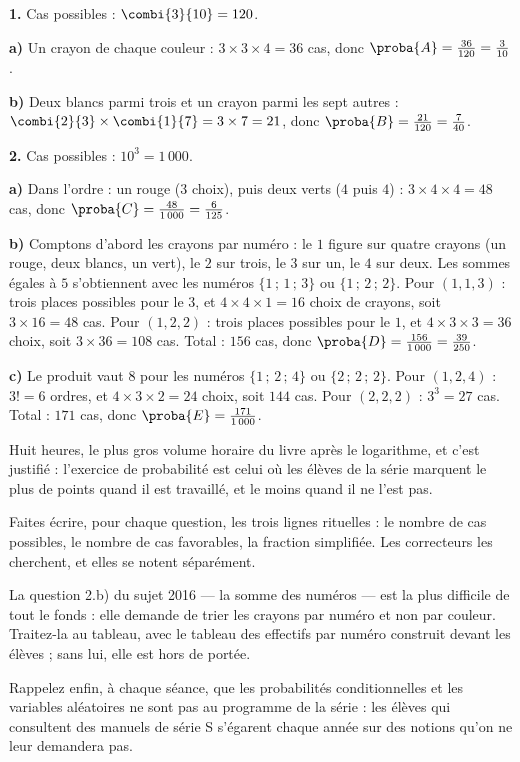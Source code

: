 \begin{corrige}
\textbf{1.} Cas possibles : $\combi{3}{10} = 120$.

\textbf{a)} Un crayon de chaque couleur : $3\times3\times4 = 36$ cas, donc
$\proba{A} = \frac{36}{120} = \frac{3}{10}$.

\textbf{b)} Deux blancs parmi trois et un crayon parmi les sept autres :
$\combi{2}{3}\times\combi{1}{7} = 3\times7 = 21$, donc
$\proba{B} = \frac{21}{120} = \frac{7}{40}$.

\textbf{2.} Cas possibles : $10^{3} = 1\,000$.

\textbf{a)} Dans l'ordre : un rouge ($3$ choix), puis deux verts ($4$ puis
$4$) : $3\times4\times4 = 48$ cas, donc
$\proba{C} = \frac{48}{1\,000} = \frac{6}{125}$.

\textbf{b)} Comptons d'abord les crayons par numéro : le $1$ figure sur
quatre crayons (un rouge, deux blancs, un vert), le $2$ sur trois, le $3$
sur un, le $4$ sur deux. Les sommes égales à $5$ s'obtiennent avec les
numéros $\{1\,;\,1\,;\,3\}$ ou $\{1\,;\,2\,;\,2\}$.
Pour $(1,1,3)$ : trois places possibles pour le $3$, et
$4\times4\times1 = 16$ choix de crayons, soit $3\times16 = 48$ cas.
Pour $(1,2,2)$ : trois places possibles pour le $1$, et
$4\times3\times3 = 36$ choix, soit $3\times36 = 108$ cas.
Total : $156$ cas, donc $\proba{D} = \frac{156}{1\,000} = \frac{39}{250}$.

\textbf{c)} Le produit vaut $8$ pour les numéros $\{1\,;\,2\,;\,4\}$ ou
$\{2\,;\,2\,;\,2\}$.
Pour $(1,2,4)$ : $3! = 6$ ordres, et $4\times3\times2 = 24$ choix, soit
$144$ cas. Pour $(2,2,2)$ : $3^{3} = 27$ cas.
Total : $171$ cas, donc $\proba{E} = \frac{171}{1\,000}$.
\end{corrige}

\begin{notepourlaclasse}
Huit heures, le plus gros volume horaire du livre après le logarithme, et
c'est justifié : l'exercice de probabilité est celui où les élèves de la
série marquent le plus de points quand il est travaillé, et le moins quand
il ne l'est pas.

Faites écrire, pour chaque question, les trois lignes rituelles : le nombre
de cas possibles, le nombre de cas favorables, la fraction simplifiée. Les
correcteurs les cherchent, et elles se notent séparément.

La question 2.b) du sujet 2016 — la somme des numéros — est la plus
difficile de tout le fonds : elle demande de trier les crayons par numéro et
non par couleur. Traitez-la au tableau, avec le tableau des effectifs par
numéro construit devant les élèves ; sans lui, elle est hors de portée.

Rappelez enfin, à chaque séance, que les probabilités conditionnelles et les
variables aléatoires ne sont pas au programme de la série : les élèves qui
consultent des manuels de série S s'égarent chaque année sur des notions
qu'on ne leur demandera pas.
\end{notepourlaclasse}
